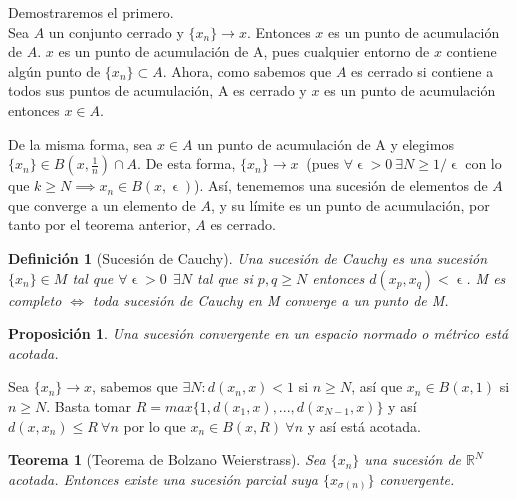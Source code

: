 \documentclass[11pt, a4paper]{article}
\makeatletter
\let\epsilon\upvarepsilon
\renewenvironment{proof}[1][\proofname] {\vspace{-15pt}\par\pushQED{\qed}\normalfont\topsep6\p@\@plus6\p@\relax\trivlist\item[\hskip\labelsep\it#1\@addpunct{.}]\ignorespaces}{\popQED\endtrivlist\@endpefalse}
\theoremstyle{theorem-style}
\newtheorem*{nth}{Teorema}
\newtheorem*{nprop}{Proposición}
\theoremstyle{definition-style}
\newtheorem*{ndef}{Definición}
\theoremstyle{remark-style}
\theoremstyle{example-style}
\makeatother
\begin{document}
\begin{proof}
	Demostraremos el primero.\\
	Sea $A$ un conjunto cerrado y $\{x_n\} \to x$. Entonces $x$ es un punto de acumulación de $A$. $x$ es un punto de acumulación de A, pues cualquier entorno de $x$ contiene algún punto de $\{x_n\}\subset A$. Ahora, como sabemos que $A$ es cerrado si contiene a todos sus puntos de acumulación, A es cerrado y $x$ es un punto de acumulación entonces $x\in A$.
	
De la misma forma, sea $x\in A$ un punto de acumulación de A y elegimos $\{x_n\}\in B(x, \frac{1}{n}) \cap A$. De esta forma, $\{x_n\} \to x \ $ (pues $ \forall \epsilon > 0 \ \exists N \geq 1 /\epsilon
$ con lo que $k\geq N \implies x_n \in B(x,\epsilon)$). Así, tenememos una sucesión de elementos de $A$ que converge a un elemento de $A$, y su límite es un punto de acumulación, por tanto por el teorema anterior, $A$ es cerrado.
\end{proof}

\begin{ndef}[Sucesión de Cauchy]
	Una sucesión de Cauchy es una sucesión $\{x_n\} \in M$ tal que $\forall \epsilon > 0 \ \ \exists N$ tal que si $p,q \geq N$ entonces $d(x_p,x_q) < \epsilon $. M es completo $\iff$ toda sucesión de Cauchy en M converge a un punto de M.
\end{ndef}

\begin{nprop}
Una sucesión convergente en un espacio normado o métrico está acotada.
	
\end{nprop}
\begin{proof}
	Sea $\{x_n\} \to x$, sabemos que $\exists N : d(x_n,x) < 1$ si $n \geq N$, así que $x_n \in B(x,1)$ si $n \geq N$. Basta tomar $R = max\{1,d(x_1,x),...,d(x_{N-1},x)\}$ y así $d(x,x_n) \leq R \ \forall n$ por lo que $x_n \in B(x,R) \ \forall n$ y así está acotada.
\end{proof}

\begin{nth}[Teorema de Bolzano Weierstrass]

Sea $\{x_n\}$ una sucesión de $\mathbb{R}^N$ acotada. Entonces existe una sucesión parcial suya $\{x_{\sigma(n)}\}$ convergente.
	
\end{nth}
\end{document}

